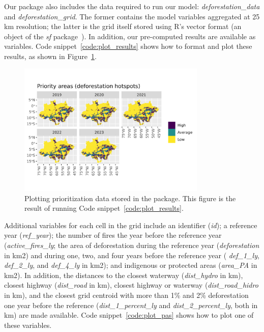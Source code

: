 \documentclass[12pt]{article}
\begin{document}
Our package also includes the data required to run our model: \textit{deforestation\_data} and \textit{deforestation\_grid}.
The former contains the model variables aggregated at 25 km resolution; the latter is the grid itself stored using \textsf{R}'s vector format (an object of the \textit{sf} package~\cite{pebesma2018}).
In addition, our pre-computed results are available as variables. Code snippet~\ref{code:plot_results} shows how to format and plot these results, as shown in Figure~\ref{fig:plot_results_precomputed}.


\begin{figure}[ht]
\centering
\includegraphics[width=0.8\textwidth,trim={0 1.0cm 0 2.0cm},clip]
{figures/plot_results_precomputed.png}
\caption{Plotting prioritization data stored in the package. This figure is the result of running Code snippet~\ref{code:plot_results}.}
\label{fig:plot_results_precomputed}
\end{figure}

Additional variables for each cell in the grid include an identifier (\textit{id}); a reference year (\textit{ref\_year});  the number of fires the year before the reference year (\textit{active\_fires\_ly}; the area of deforestation during the reference year (\textit{deforestation} in km2) and during one, two, and four years before the reference year ( \textit{def\_1\_ly}, \textit{def\_2\_ly}, and \textit{def\_4\_ly} in km2); and indigenous or protected areas (\textit{area\_PA} in km2).
In addition, the distances to the closest waterway (\textit{dist\_hydro} in km), closest highway (\textit{dist\_road} in km), closest highway or waterway (\textit{dist\_road\_hidro} in km),  and the closest grid centroid with more than 1\% and 2\% deforestation one year before the reference (\textit{dist\_1\_percent\_ly} and  \textit{dist\_2\_percent\_ly}, both in km) are made available.
Code snippet~\ref{code:plot_pas} shows how to plot one of these variables.
\end{document}
